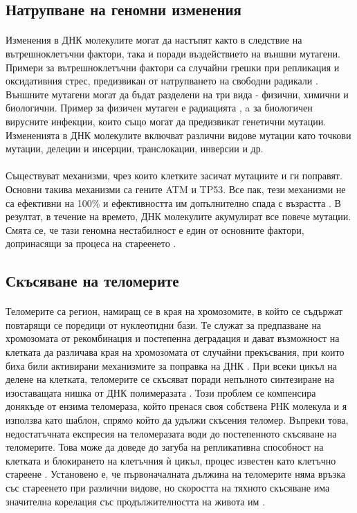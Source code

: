 \documentclass[pdftex,cyrillic,14pt,a4page,twoside,openright]{extreport}
\begin{document}
\subsection{Натрупване на геномни изменения}
\paragraph{}
Изменения в ДНК молекулите могат да настъпят както в следствие на вътрешноклетъчни фактори, така и поради въздействието на външни мутагени. Примери за вътрешноклетъчни фактори са случайни грешки при репликация и оксидативния стрес, предизвикан от натрупването на свободни радикали \cite{wang1998}. Външните мутагени могат да бъдат разделени на три вида - физични, химични и биологични. Пример за физичен мутаген е радиацията \cite{breimer1988}, a за биологичен вирусните инфекции, които също могат да предизвикат генетични мутации. Измененията в ДНК молекулите включват различни видове мутации като точкови мутации, делеции и инсерции, транслокации, инверсии и др.\\\\
Съществуват механизми, чрез които клетките засичат мутациите и ги поправят. Основни такива механизми са гените ATM и TP53. Все пак, тези механизми не са ефективни на 100\% и ефективността им допълнително спада с възрастта \cite{auley2017}. В резултат, в течение на времето, ДНК молекулите акумулират все повече мутации. Смята се, че тази геномна нестабилност е един от основните фактори, допринасящи за процеса на стареенето \cite{vijg2013}.

\subsection{Скъсяване на теломерите}
\paragraph{}
Теломерите са регион, намиращ се в края на хромозомите, в който се съдържат повтарящи се поредици от нуклеотидни бази. Те служат за предпазване на хромозомата от рекомбинация и постепенна деградация и дават възможност на клетката да различава края на хромозомата от случайни прекъсвания, при които биха били активирани механизмите за поправка на ДНК \cite{griffith1999}. При всеки цикъл на делене на клетката, теломерите се скъсяват поради непълното синтезиране на изоставащата нишка от ДНК полимеразата \cite{koliada2015}. Този проблем се компенсира донякъде от ензима теломераза, който пренася своя собствена РНК молекула и я използва като шаблон, спрямо който да удължи скъсения теломер. Въпреки това, недостатъчната експресия на теломеразата води до постепенното скъсяване на теломерите. Това може да доведе до загуба на репликативна способност на клетката и блокирането на клетъчния ѝ цикъл, процес известен като клетъчно стареене \cite{muraki2012}. Установено е, че първоначалната дължина на теломерите няма връзка със стареенето при различни видове, но скоростта на тяхното скъсяване има значителна корелация със продължителността на живота им \cite{whittemore2019}.
\end{document}
